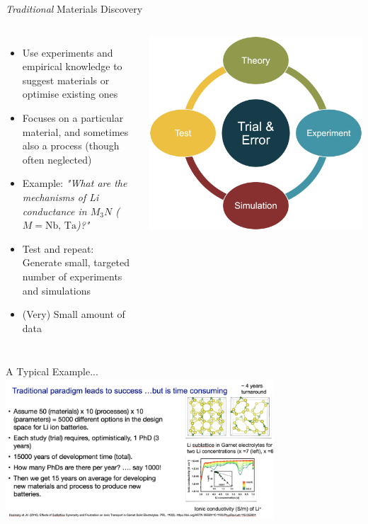 \documentclass[aspectratio=169]{beamer}
\begin{document}
\begin{frame}{{\it Traditional} Materials Discovery}
  \begin{columns}
    \begin{itemize}
        \item Use experiments and  empirical knowledge to suggest materials or optimise existing ones
        \item Focuses on a particular material, and sometimes also a process (though often neglected)
        \item Example: \textit{"What are the mechanisms of Li conductance in $M_3N$ ($M = \text{Nb, Ta}$)?"}
        \item Test and repeat: Generate small, targeted number of experiments and simulations
        \item (Very) Small amount of data
    \end{itemize}

    \vspace{1em}
    \begin{center}
        \includegraphics[width=0.75\linewidth]{media/traditional_science.png}
    \end{center}
  \end{columns}
\end{frame}

\begin{frame}{A Typical Example...}
  \includegraphics[width=0.75\textwidth]{media/garnet_time.png}
\end{frame}
\end{document}
